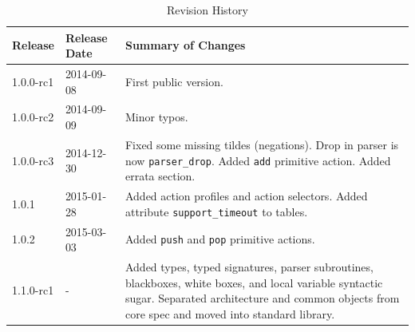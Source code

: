 \documentclass[12pt]{article}
\begin{document}
\begin{table}[H]
\begin{center}
\begin{tabular}{| l | l | p{} |} \hline
\textbf{Release} &
\textbf{Release Date} &
\textbf{Summary of Changes} \\  \hline
1.0.0-rc1 & 2014-09-08 & First public version. \\  \hline
1.0.0-rc2 & 2014-09-09 & Minor typos. \\  \hline
1.0.0-rc3 & 2014-12-30 & Fixed some missing tildes (negations). Drop in parser is now \texttt{parser_drop}. Added \texttt{add} primitive action. Added errata section. \\  \hline
1.0.1 & 2015-01-28 & Added action profiles and action selectors. Added attribute \texttt{support_timeout} to tables. \\  \hline
1.0.2 & 2015-03-03 & Added \texttt{push} and \texttt{pop} primitive actions. \\  \hline
1.1.0-rc1 & - & Added types, typed signatures, parser subroutines, blackboxes, white boxes, and local variable syntactic sugar. Separated architecture and common objects from core spec and moved into standard library. \\  \hline
\end{tabular}
\end{center}
\caption{Revision History}
\label{tab:revhistory}
\end{table}


\end{document}
